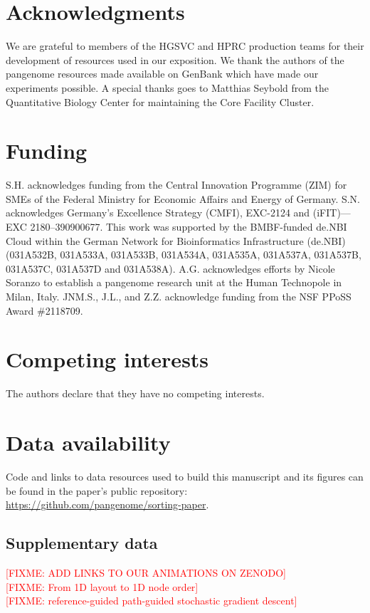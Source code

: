 \documentclass{bioinfo}
\theoremstyle{definition}
\newcommand{\red}[1]{{\textcolor{Red}{#1}}}
\newcommand{\FIXME}[1]{\red{[FIXME: #1]}}
\begin{document}
	\section*{Acknowledgments}
	
	We are grateful to members of the HGSVC and HPRC production teams for their development of resources used in our exposition.
	We thank the authors of the pangenome resources made available on GenBank which have made our experiments possible.
	A special thanks goes to Matthias Seybold from the Quantitative Biology Center for maintaining the Core Facility Cluster.
	
	\section*{Funding}
	
	S.H. acknowledges funding from the Central Innovation Programme (ZIM) for SMEs of the Federal Ministry for Economic Affairs and Energy of Germany.
	S.N. acknowledges Germany’s Excellence Strategy (CMFI), EXC-2124 and (iFIT)—EXC 2180–390900677.
	This work was supported by the BMBF-funded de.NBI Cloud within the German Network for Bioinformatics Infrastructure (de.NBI) (031A532B, 031A533A, 031A533B, 031A534A, 031A535A, 031A537A, 031A537B, 031A537C, 031A537D and 031A538A).
	A.G. acknowledges efforts by Nicole Soranzo to establish a pangenome research unit at the Human Technopole in Milan, Italy.
	JNM.S., J.L., and Z.Z. acknowledge funding from the NSF PPoSS Award \#2118709.
	
	\section*{Competing interests}
	The authors declare that they have no competing interests.
	
	\section*{Data availability}
	
	Code and links to data resources used to build this manuscript and its figures can be found in the paper's public repository: \url{https://github.com/pangenome/sorting-paper}.
		
	
	
	
	
	\begin{appendices}
	    \section{Supplementary data}
		\FIXME{ADD LINKS TO OUR ANIMATIONS ON ZENODO} \\
	    \FIXME{From 1D layout to 1D node order} \\
	    \FIXME{reference-guided path-guided stochastic gradient descent}
	\end{appendices}
\end{document}
